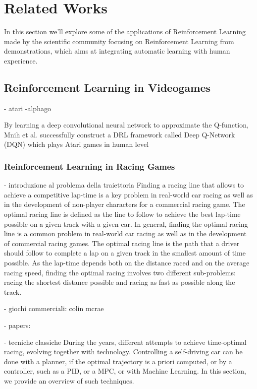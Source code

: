 \section{Related Works}









In this section we'll explore some of the applications of Reinforcement Learning made by the scientific community focusing on Reinforcement Learning from demonstrations, which aims at integrating automatic learning with human experience.



\subsection{Reinforcement Learning in Videogames}
- atari
-alphago


By learning a deep convolutional neural network
to approximate the Q-function, Mnih et al. successfully
construct a DRL framework called Deep Q-Network (DQN)
which plays Atari games in human level

\subsubsection{Reinforcement Learning in Racing Games}



- introduzione al problema della traiettoria
Finding a racing line that allows to achieve a competitive lap-time is a key problem in real-world car racing as well as in the development of non-player characters for a commercial racing game.
The optimal racing line is defined as the line to follow to achieve the best lap-time possible on a given track with a given car. In general, finding the optimal racing line is
a common problem in real-world car racing as well as in the development of commercial racing games. The optimal racing line is the path that a driver should follow to complete a lap on a given track in the smallest amount of time possible. As the lap-time depends both on the distance raced and on the average racing speed, finding the optimal racing involves two different sub-problems: racing the shortest distance possible and racing as fast
as possible along the track.

- giochi commerciali: 
	colin mcrae

- papers:

- tecniche classiche
During the years, different attempts to achieve time-optimal racing, evolving together with technology. Controlling a self-driving car can be done with a planner, if the optimal trajectory is a priori computed, or by a controller, such as a PID, or a MPC, or with Machine Learning. In this section, we provide an overview of such techniques. 


